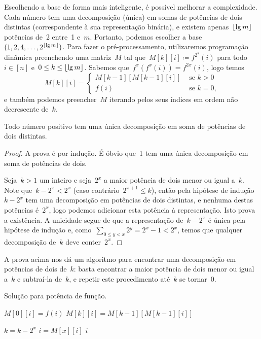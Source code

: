 \documentclass[../../main.tex]{subfiles}
\begin{document}
Escolhendo a base de forma mais inteligente, é possível melhorar a complexidade. Cada número tem uma decomposição (única) em somas de potências de dois distintas (correspondente à sua representação binária), e existem apenas~$\lfloor\lg m\rfloor$ potências de~2 entre~1 e~$m$. Portanto, podemos escolher a base~${(1, 2, 4, \ldots, 2^{\lfloor\lg m\rfloor})}$. Para fazer o pré-processamento, utilizaremos programação dinâmica preenchendo uma matriz~$M$ tal que~${M[k][i] \coloneqq f^{2^k}(i)}$ para todo~$i \in [n]$ e~$0 \leq k \leq \lfloor\lg m\rfloor$. Sabemos que~$f^x(f^x(i)) = f^{2x}(i)$, logo temos
$$M[k][i] = \left\{
	\begin{array}{ll}
		M[k-1][M[k - 1][i]] & \text{ se $k > 0$} \\
		f(i) & \text{ se $k = 0$,}
	\end{array}
	\right.
$$
e também podemos preencher~$M$ iterando pelos seus índices em ordem não decrescente de~$k$.

\begin{theorem} \label{thm:pot2}
	Todo número positivo tem uma única decomposição em soma de potências de dois distintas.
\end{theorem}
\begin{proof}
	A prova é por indução. É óbvio que~1 tem uma única decomposição em soma de potências de dois.

	Seja~$k > 1$ um inteiro e seja~$2^x$ a maior potência de dois menor ou igual a~$k$. Note que~$k - 2^x < 2^x$ (caso contrário~$2^{x+1} \leq k$), então pela hipótese de indução~$k - 2^x$ tem uma decomposição em potências de dois distintas, e nenhuma destas potências é~$2^x$, logo podemos adicionar esta potência à representação. Isto prova a existência. A unicidade segue de que a representação de~$k - 2^x$ é única pela hipótese de indução e, como~$\sum\limits_{0 \leq y < x}{2^{y}} = 2^x - 1 < 2^x$, temos que qualquer decomposição de~$k$ deve conter~$2^x$.
\end{proof}

A prova acima nos dá um algoritmo para encontrar uma decomposição em potências de dois de~$k$: basta encontrar a maior potência de dois menor ou igual a~$k$ e subtraí-la de~$k$, e repetir este procedimento até~$k$ se tornar~0.

\begin{algorithm}
	\caption{Solução para potência de função.} \label{lst:potfunclg}
\begin{algorithmic}[1]
			\State $M[0][i] = f(i)$
		\EndFor
				\State $M[k][i] = M[k - 1][M[k - 1][i]]$
			\EndFor
		\EndFor
	\EndFunction

	 
				\State $k = k - 2^x$
				\State $i = M[x][i]$
			\EndIf
		\EndFor
		\State \Return $i$
	\EndFunction
\end{algorithmic}
\end{algorithm}
\end{document}
